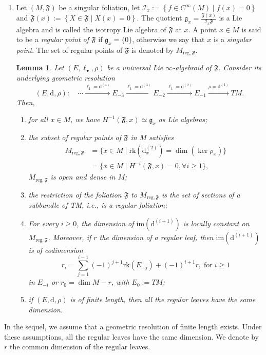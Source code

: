 \documentclass[10pt]{article}
\theoremstyle{plain}
\newtheorem{lemma}{Lemma}[section]
\theoremstyle{definition}
\theoremstyle{remark}
\newcommand{\dd}{\mathrm{d}}
\begin{document}
\begin{enumerate}
  
  \item  Let $(M,\mathfrak{F})$ be a singular foliation, let $\mathcal I_x := \left\lbrace f \in
C^\infty (M )\mid  f (x) = 0\right\rbrace$ and $\mathfrak F(x):= \left\lbrace X \in\mathfrak F \mid  X(x) =0\right\rbrace$. The quotient   $\mathfrak{g}_x=\frac{\mathfrak{F}(x)}{\mathcal{I}_x\mathfrak{F}}$ is a Lie algebra and is called the isotropy Lie algebra of $\mathfrak{F}$ at $x$. A point $x\in M$ is said to be a \emph{regular point of $\mathfrak F$} if $\mathfrak g_x=\{0\}$, otherwise we say that $x$ is a \emph{singular point}. The set of regular points of $\mathfrak F$ is denoted by $M_{\mathrm{reg},\mathfrak F}$.\begin{lemma}\cite{LLS}\label{lemma:M_reg}
Let $(E,\ell_\bullet, \rho)$ be a universal  Lie $\infty$-algebroid of $\mathfrak{F}$. Consider its underlying geometric resolution 
\begin{equation*}
(E, \dd, \rho) :\quad\cdots \stackrel{\ell_1=\dd^{(4)}} \longrightarrow E_{-3} \stackrel{\ell_1=\dd^{(3)}}{\longrightarrow} E_{-2} \stackrel{\ell_1=\dd^{(2)}}{\longrightarrow} E_{-1} \stackrel{\rho=\dd^{(1)}}{\longrightarrow} TM.\end{equation*} Then, 
\begin{enumerate}
 \item for all $x\in M$, we have $   H^{-1}(\mathfrak F,x)\simeq \mathfrak{g}_x$ as Lie algebras;
    \item the subset of regular points of $\mathfrak F$ in $M$ satisfies \begin{align*}
    M_{\mathrm{reg}, \mathfrak{F}}&=
    \{x\in M \mid \mathrm{rk}(\dd^{(2)}_x)=\dim(\ker\rho_x)\}\\&=
    \{x\in M \mid H^{-i}(\mathfrak{F}, x)=0, \forall i\geq 1\},
    \end{align*}
    $M_{\mathrm{reg}, \mathfrak  F}$ is open and dense in $M$;

\item the restriction of the foliation $\mathfrak{F}$ to $M_{\mathrm{reg}, \mathfrak  F}$ is
the set of sections of a subbundle of TM, i.e., is a regular foliation;
\item \label{iterated-ranks} For every $i\geq 0$, the dimension of $\mathrm{im}\left(\dd^{(i+1)}\right)$ is locally constant on $M_{\mathrm{reg}, \mathfrak  F}$. Moreover, if $r$ the dimension of a regular leaf, then $\mathrm{im}(\dd^{(i+1)})$ is of codimension  $$r_i={\sum_{j=1}^{i-1}}(-1)^{j+1}\mathrm{rk}(E_{-j})+(-1)^{i+1}r, \;\text{for}\; i\geq 1$$ in $E_{-i}$ or $r_0=\dim M-r$, with  $E_0:=TM$;
\item if $(E,\dd,\rho)$ is of finite length, then all the regular leaves have the same dimension.
\end{enumerate}
\end{lemma}
\end{enumerate}
In the sequel, we assume that a geometric resolution of finite length exists. Under these assumptions, all the regular leaves have the same dimension. We denote by $r$ the common dimension of the regular leaves.
\end{document}
